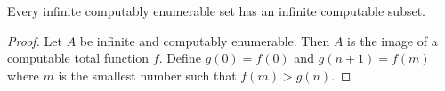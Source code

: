\begin{corollary}
  Every infinite computably enumerable set has an infinite computable subset.
\end{corollary}

\begin{proof}
  Let $A$ be infinite and computably enumerable.
  Then $A$ is the image of a computable total function $f$.
  Define $g(0) = f(0)$ and $g(n+1) = f(m)$ where $m$ is the smallest number such
  that $f(m) > g(n)$.
\end{proof}

